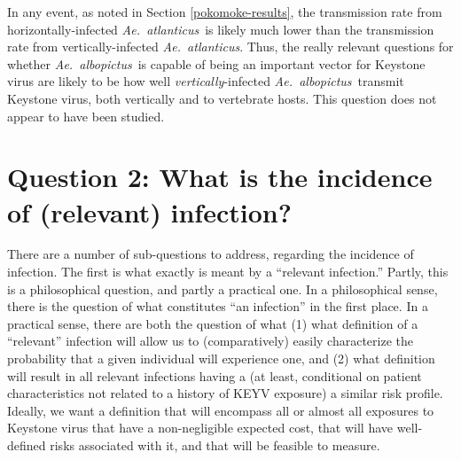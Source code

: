 \documentclass[12pt]{article}
\newcommand{\alb}{\textit{Ae.\ albopictus}}
\newcommand{\atl}{\textit{Ae.\ atlanticus}}
\newcommand{\cjh}{\textcolor{blue}{cjh}}
\newcommand{\tjh}{\textcolor{red}{tjh}}
\newcommand{\msg}[3]{(#1 $\rightarrow$ #2: #3)}
\newcommand{\mcc}[1]{\msg\cjh\cjh{#1}}
\newcommand{\mtc}[1]{\msg\tjh\cjh{#1}}
\begin{document}
        In any event, as noted in Section \ref{pokomoke-results}, the transmission rate from horizontally-infected \atl\ is likely much lower than the transmission rate from vertically-infected \atl. Thus, the really relevant questions for whether \alb\ is capable of being an important vector for Keystone virus are likely to be how well \textit{vertically}-infected \alb\ transmit Keystone virus, both vertically and to vertebrate hosts. This question does not appear to have been studied.

    \section[Incidence of infection]{Question 2: What is the incidence of (relevant) infection?}
        \label{incidence}

        There are a number of sub-questions to address, regarding the incidence of infection. The first is what exactly is meant by a ``relevant infection.'' Partly, this is a philosophical question, and partly a practical one. In a philosophical sense, there is the question of what constitutes ``an infection'' in the first place. In a practical sense, there are both the question of what (1) what definition of a ``relevant'' infection will allow us to (comparatively) easily characterize the probability that a given individual will experience one, and (2) what definition will result in all relevant infections having a (at least, conditional on patient characteristics not related to a history of KEYV exposure) a similar risk profile. Ideally, we want a definition that will encompass all or almost all exposures to Keystone virus that have a non-negligible expected cost, that will have well-defined risks associated with it, and that will be feasible to measure.
\end{document}
